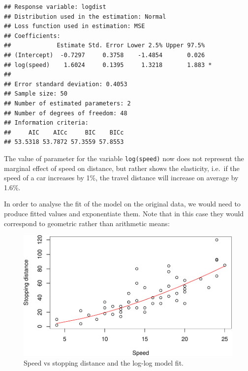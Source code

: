 \documentclass[
]{book}
\newenvironment{Shaded}{\begin{snugshade}}{\end{snugshade}}
\newcommand{\AttributeTok}[1]{\textcolor[rgb]{0.77,0.63,0.00}{#1}}
\newcommand{\FunctionTok}[1]{\textcolor[rgb]{0.00,0.00,0.00}{#1}}
\newcommand{\NormalTok}[1]{#1}
\newcommand{\SpecialCharTok}[1]{\textcolor[rgb]{0.00,0.00,0.00}{#1}}
\newcommand{\StringTok}[1]{\textcolor[rgb]{0.31,0.60,0.02}{#1}}
\theoremstyle{definition}
\theoremstyle{definition}
\theoremstyle{definition}
\theoremstyle{definition}
\theoremstyle{remark}
\begin{document}
\begin{verbatim}
## Response variable: logdist
## Distribution used in the estimation: Normal
## Loss function used in estimation: MSE
## Coefficients:
##             Estimate Std. Error Lower 2.5% Upper 97.5%  
## (Intercept)  -0.7297     0.3758    -1.4854       0.026  
## log(speed)    1.6024     0.1395     1.3218       1.883 *
## 
## Error standard deviation: 0.4053
## Sample size: 50
## Number of estimated parameters: 2
## Number of degrees of freedom: 48
## Information criteria:
##     AIC    AICc     BIC    BICc 
## 53.5318 53.7872 57.3559 57.8553
\end{verbatim}

The value of parameter for the variable \texttt{log(speed)} now does not represent the marginal effect of speed on distance, but rather shows the elasticity, i.e.~if the speed of a car increases by 1\%, the travel distance will increase on average by 1.6\%.

In order to analyse the fit of the model on the original data, we would need to produce fitted values and exponentiate them. Note that in this case they would correspond to geometric rather than arithmetic means:

\begin{Shaded}
\end{Shaded}

\begin{figure}
\centering
\includegraphics{Svetunkov---Statistics-for-Business-Analytics_files/figure-latex/speedDistanceLogExp-1.pdf}
\caption{\label{fig:speedDistanceLogExp}Speed vs stopping distance and the log-log model fit.}
\end{figure}
\end{document}
